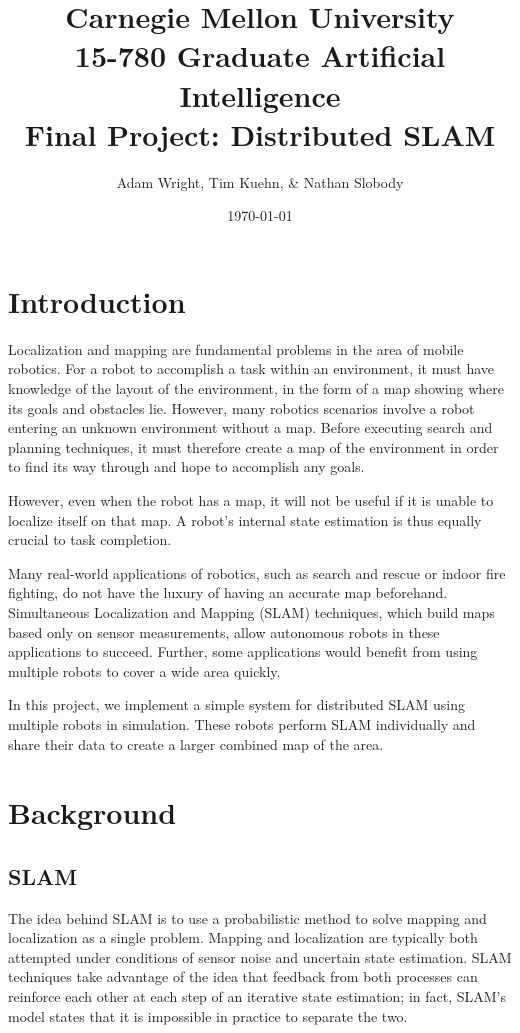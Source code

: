 \documentclass[prodmode,acmtecs]{acmsmall} %
\title{
    Carnegie Mellon University \\
    15-780 Graduate Artificial Intelligence \\
    Final Project: Distributed SLAM
}
\author{
    Adam Wright, Tim Kuehn, \& Nathan Slobody \\
}
\date{\today}
\begin{document}
\maketitle

\setcounter{tocdepth}{2}

\section{Introduction}

Localization and mapping are fundamental problems in the area of mobile robotics.  For a robot to accomplish a task within an environment, it must have knowledge of the layout of the environment, in the form of a map showing where its goals and obstacles lie.  However, many robotics scenarios involve a robot entering an unknown environment without a map.  Before executing search and planning techniques, it must therefore create a map of the environment in order to find its way through and hope to accomplish any goals.  

However, even when the robot has a map, it will not be useful if it is unable to localize itself on that map.  A robot's internal state estimation is thus equally crucial to task completion.

Many real-world applications of robotics, such as search and rescue or indoor fire fighting, do not have the luxury of having an accurate map beforehand. Simultaneous Localization and Mapping (SLAM) techniques, which build maps based only on sensor measurements, allow autonomous robots in these applications to succeed. Further, some applications would benefit from using multiple robots to cover a wide area quickly.

In this project, we implement a simple system for distributed SLAM using multiple robots in simulation.  These robots perform SLAM individually and share their data to create a larger combined map of the area.

\section{Background}

\subsection{SLAM}

The idea behind SLAM is to use a probabilistic method to solve mapping and localization as a single problem.  Mapping and localization are typically both attempted under conditions of sensor noise and uncertain state estimation.  SLAM techniques take advantage of the idea that feedback from both processes can reinforce each other at each step of an iterative state estimation; in fact, SLAM's model states that it is impossible in practice to separate the two.
\end{document}
